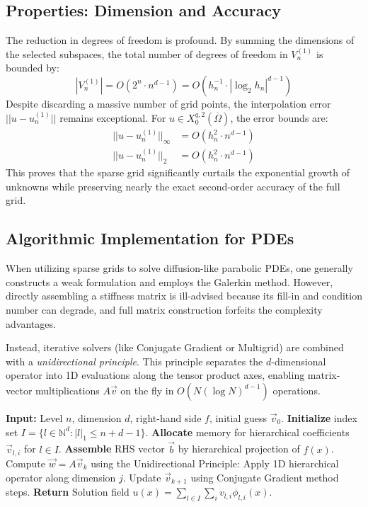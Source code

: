 \documentclass[12pt, a4paper]{article}
\begin{document}
\subsection{Properties: Dimension and Accuracy}
The reduction in degrees of freedom is profound. By summing the dimensions of the selected subspaces, the total number of degrees of freedom in $V_n^{(1)}$ is bounded by:
\begin{equation}
|V_n^{(1)}| = O(2^n \cdot n^{d-1}) = O(h_n^{-1} \cdot |\log_2 h_n|^{d-1})
\end{equation}
Despite discarding a massive number of grid points, the interpolation error $||u - u_n^{(1)}||$ remains exceptional. For $u \in X_0^{q,2}(\overline{\Omega})$, the error bounds are:
\begin{align}
||u - u_n^{(1)}||_\infty &= O(h_n^2 \cdot n^{d-1}) \\
||u - u_n^{(1)}||_2 &= O(h_n^2 \cdot n^{d-1})
\end{align}
This proves that the sparse grid significantly curtails the exponential growth of unknowns while preserving nearly the exact second-order accuracy of the full grid. 

\subsection{Algorithmic Implementation for PDEs}
When utilizing sparse grids to solve diffusion-like parabolic PDEs, one generally constructs a weak formulation and employs the Galerkin method. However, directly assembling a stiffness matrix is ill-advised because its fill-in and condition number can degrade, and full matrix construction forfeits the complexity advantages. 

Instead, iterative solvers (like Conjugate Gradient or Multigrid) are combined with a \textit{unidirectional principle}. This principle separates the $d$-dimensional operator into 1D evaluations along the tensor product axes, enabling matrix-vector multiplications $A\vec{v}$ on the fly in $O(N (\log N)^{d-1})$ operations.

\begin{algorithm}
\caption{Solving Parabolic PDE on a Sparse Grid}
\begin{algorithmic}[1]
\State \textbf{Input:} Level $n$, dimension $d$, right-hand side $f$, initial guess $\vec{v}_0$.
\State \textbf{Initialize} index set $I = \{ l \in \mathbb{N}^d : |l|_1 \le n + d - 1 \}$.
\State \textbf{Allocate} memory for hierarchical coefficients $\vec{v}_{l,i}$ for $l \in I$.
\State \textbf{Assemble} RHS vector $\vec{b}$ by hierarchical projection of $f(x)$.
    \State Compute $\vec{w} = A \vec{v}_k$ using the Unidirectional Principle:
        \State Apply 1D hierarchical operator along dimension $j$.
    \EndFor
    \State Update $\vec{v}_{k+1}$ using Conjugate Gradient method steps.
\EndWhile
\State \textbf{Return} Solution field $u(x) = \sum_{l \in I} \sum_{i} v_{l,i} \phi_{l,i}(x)$.
\end{algorithmic}
\end{algorithm}
\end{document}
